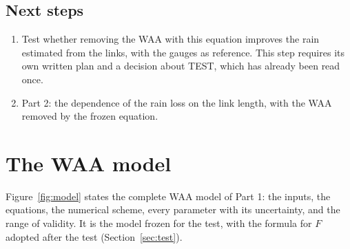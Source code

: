 \documentclass[11pt,a4paper]{article}
\begin{document}
\subsection{Next steps}
\begin{enumerate}[leftmargin=1.5em]
\item Test whether removing the WAA with this equation improves the rain estimated from the links, with the gauges as reference.
This step requires its own written plan and a decision about TEST, which has already been read once.
\item Part 2: the dependence of the rain loss on the link length, with the WAA removed by the frozen equation.
\end{enumerate}

\section{The WAA model}
\label{sec:model}
Figure~\ref{fig:model} states the complete WAA model of Part 1: the inputs, the equations, the numerical scheme, every
parameter with its uncertainty, and the range of validity. It is the model frozen for the test, with the formula for $F$
adopted after the test (Section~\ref{sec:test}).
\end{document}
